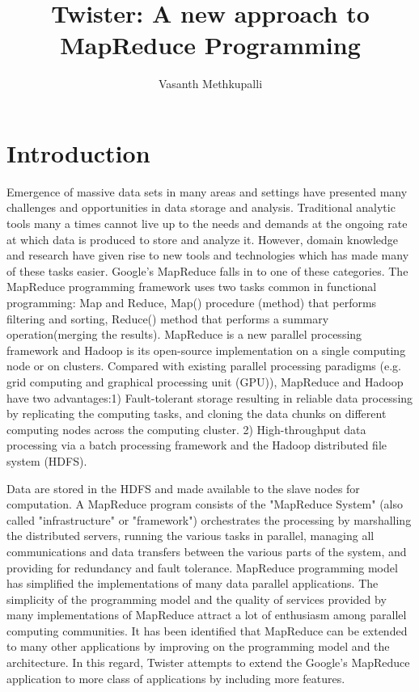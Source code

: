 \documentclass[9pt,twocolumn,twoside]{styles/osajnl}
\title{Twister: A new approach to MapReduce Programming}
\author[1,*]{Vasanth Methkupalli}
\affil[1]{School of Informatics and Computing, Bloomington, IN 47408, U.S.A.}
\affil[*]{Corresponding authors: mvasanthiiit@gmail.com}
\begin{document}
\maketitle

\section{Introduction}

Emergence of massive data sets in many areas and settings have
presented many challenges and opportunities in data storage and
analysis\cite{dean2008mapreduce}\cite{mohebi2016iterative}. Traditional
analytic tools many a times cannot live up to the needs and demands at
the ongoing rate at which data is produced to store and analyze
it\cite{lee2012parallel}. However, domain knowledge and research have
given rise to new tools and technologies which has made many of these
tasks easier\cite{zaharia2010spark}. Google’s MapReduce falls in to
one of these categories. The MapReduce programming framework uses two
tasks common in functional programming: Map and Reduce, Map()
procedure (method) that performs filtering and sorting, Reduce()
method that performs a summary operation(merging the
results)\cite{wikipedia}\cite{mohammed2014applications}. MapReduce is
a new parallel processing framework and Hadoop is its open-source
implementation on a single computing node or on clusters. Compared
with existing parallel processing paradigms (e.g. grid computing and
graphical processing unit (GPU)), MapReduce and Hadoop have two
advantages:1) Fault-tolerant storage resulting in reliable data
processing by replicating the computing tasks, and cloning the data
chunks on different computing nodes across the computing cluster. 2)
High-throughput data processing via a batch processing framework and
the Hadoop distributed file system
(HDFS)\cite{elsayed2014mapreduce}\cite{ekanayake2010twister}\cite{lee2012parallel}.


Data are stored in the HDFS and made available to the slave nodes for
computation. A MapReduce program consists of the "MapReduce System"
(also called "infrastructure" or "framework") orchestrates the
processing by marshalling the distributed servers, running the various
tasks in parallel, managing all communications and data transfers
between the various parts of the system, and providing for redundancy
and fault tolerance\cite{mohammed2014applications}. MapReduce
programming model has simplified the implementations of many data
parallel applications\cite{lee2012parallel}. The simplicity of the
programming model and the quality of services provided by many
implementations of MapReduce attract a lot of enthusiasm among
parallel computing
communities\cite{ekanayake2010twister}\cite{grolinger2014challenges}. It
has been identified that MapReduce can be extended to many other
applications by improving on the programming model and the
architecture. In this regard, Twister attempts to extend the Google’s
MapReduce application to more class of applications by including more
features\cite{twister}\cite{doulkeridis2014survey}.
\end{document}
